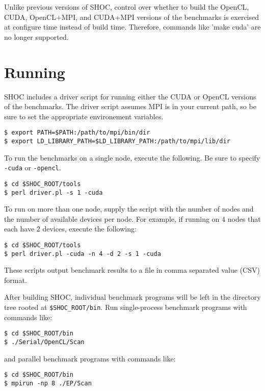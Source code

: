 \documentclass[11pt]{article}
\begin{document}
Unlike previous versions of SHOC, control over whether to build the 
OpenCL, CUDA, OpenCL+MPI, and CUDA+MPI versions of the benchmarks is
exercised at configure time instead of build time.
Therefore, commands like 'make cuda' are no longer supported.


\section{Running}\label{sec:running}

SHOC includes a driver script for running either the CUDA or OpenCL versions
of the benchmarks. The driver script assumes MPI is in your current path,
so be sure to set the appropriate environement variables.

\begin{Verbatim}[frame=single]
$ export PATH=$PATH:/path/to/mpi/bin/dir
$ export LD_LIBRARY_PATH=$LD_LIBRARY_PATH:/path/to/mpi/lib/dir
\end{Verbatim}

To run the benchmarks on a single node, execute the following. Be sure
to specify \verb+-cuda+ or \verb+-opencl+.

\begin{Verbatim}[frame=single]
$ cd $SHOC_ROOT/tools
$ perl driver.pl -s 1 -cuda
\end{Verbatim}

To run on more than one node, supply the script with the number of nodes and 
the number of available devices per node.  For example, if running on 
4 nodes that each have 2 devices, execute the following: 

\begin{Verbatim}[frame=single]
$ cd $SHOC_ROOT/tools
$ perl driver.pl -cuda -n 4 -d 2 -s 1 -cuda
\end{Verbatim}

These scripts output benchmark results to a file in comma separated value (CSV) format.

After building SHOC, individual benchmark programs will be left in the
directory tree rooted at \verb+$SHOC_ROOT/bin+.
Run single-process benchmark programs with commands like:

\begin{Verbatim}[frame=single]
$ cd $SHOC_ROOT/bin
$ ./Serial/OpenCL/Scan 
\end{Verbatim}

and parallel benchmark programs with commands like:

\begin{Verbatim}[frame=single]
$ cd $SHOC_ROOT/bin
$ mpirun -np 8 ./EP/Scan
\end{Verbatim}
\end{document}
